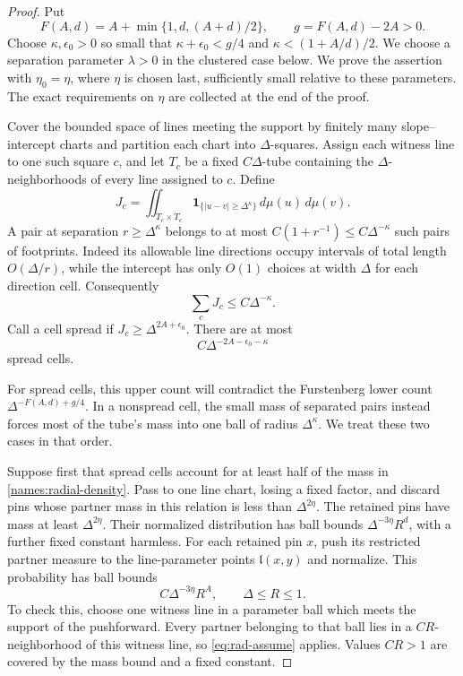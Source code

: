 \begin{proof}
Put
\[
 F(A,d)=A+\min\{1,d,(A+d)/2\},\qquad
 g=F(A,d)-2A>0.
\]
Choose $\kappa,\epsilon_0>0$ so small that
$\kappa+\epsilon_0<g/4$ and $\kappa<(1+A/d)/2$. We choose
a separation parameter $\lambda>0$ in the clustered case below.
We prove the assertion with $\eta_0=\eta$, where $\eta$ is chosen
last, sufficiently small relative to these parameters. The exact
requirements on $\eta$ are collected at the end of the proof.

Cover the bounded space of lines meeting the support by finitely
many slope--intercept charts and partition each chart into
$\Delta$-squares.  Assign each witness line to one such square
$c$, and let $T_c$ be a fixed $C\Delta$-tube containing the
$\Delta$-neighborhoods of every line assigned to $c$.  Define
\[
 J_c=\iint_{T_c\times T_c}
             \mathbf 1_{\{|u-v|\geq\Delta^\kappa\}}
             \,d\mu(u)\,d\mu(v).
\]
A pair at separation $r\geq\Delta^\kappa$ belongs to at most
$C(1+r^{-1})\leq C\Delta^{-\kappa}$ such pairs of footprints.
Indeed its allowable line directions occupy intervals of total
length $O(\Delta/r)$, while the intercept has only $O(1)$
choices at width $\Delta$ for each direction cell.  Consequently
\[
 \sum_cJ_c\leq C\Delta^{-\kappa}.
\]
Call a cell spread if $J_c\geq\Delta^{2A+\epsilon_0}$.
There are at most
\begin{equation}\label{names:radial-spread-count}
 C\Delta^{-2A-\epsilon_0-\kappa}
\end{equation}
spread cells.

For spread cells, this upper count will contradict the Furstenberg
lower count $\Delta^{-F(A,d)+g/4}$. In a nonspread cell, the small
mass of separated pairs instead forces most of the tube's mass
into one ball of radius $\Delta^\kappa$. We treat these two cases
in that order.

Suppose first that spread cells account for at least half of the
mass in \eqref{names:radial-density}.  Pass to one line chart,
losing a fixed factor, and discard pins whose partner mass in this
relation is less than $\Delta^{2\eta}$.  The retained pins have
mass at least $\Delta^{2\eta}$.  Their normalized distribution
has ball bounds $\Delta^{-3\eta}R^d$, with a further fixed
constant harmless.  For each retained pin $x$, push its restricted
partner measure to the line-parameter points
$\mathfrak l(x,y)$ and normalize.  This probability has ball
bounds
\[
 C\Delta^{-3\eta}R^A,\qquad \Delta\leq R\leq1.
\]
To check this, choose one witness line in a parameter ball which
meets the support of the pushforward.  Every partner belonging
to that ball lies in a $CR$-neighborhood of this witness line,
so \eqref{eq:rad-assume} applies.  Values $CR>1$ are covered by
the mass bound and a fixed constant.


\end{proof}
